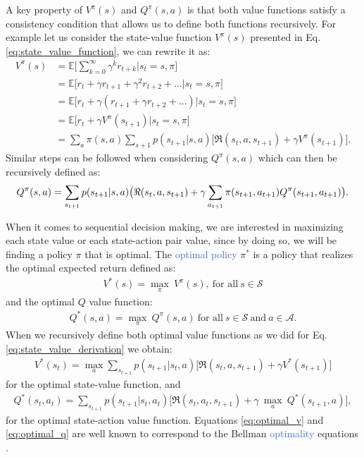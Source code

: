A key property of $V^{\pi}(s)$ and $Q^{\pi}(s,a)$ is that both value functions satisfy a consistency condition that allows us to define both functions recursively. For example let us consider the state-value function $V^{\pi}(s)$ presented in Eq. \ref{eq:state_value_function}, we can rewrite it as:
\begin{equation}
\begin{split}
 V^{\pi}(s) & =\mathds{E}\big[\sum_{k=0}^{\infty}\gamma^{k}r_{t+k}\big| s_t = s, \pi \big] \\ 
 & =\mathds{E}\big[r_{t}+\gamma r_{t+1}+\gamma^{2}r_{t+2}+\ldots \big| s_t =s , \pi \big] \\ 
 & =\mathds{E}\big[r_{t}+\gamma(r_{t+1}+\gamma r_{t+2}+\ldots)\big| s_t =s , \pi \big] \\
 & =\mathds{E}\big[r_{t}+\gamma V^{\pi}(s_{t+1}) \big| s_t =s , \pi \big] \\
 & =\sum_a \pi(s,a) \sum_{s+1} p(s_{t+1}|s,a)\big[\Re(s_t, a, s_{t+1}) + \gamma V^{\pi}(s_{t+1}) \big].
\end{split}
\label{eq:state_value_derivation}
\end{equation}
Similar steps can be followed when considering $Q^{\pi}(s,a)$ which can then be recursively defined as:
\begin{equation}
	Q^{\pi}(s,a) = \sum_{s_{t+1}} p(s_{t+1}|s,a)\big(\Re(s_t, a, s_{t+1}) + \\ \gamma \sum_{a_{t+1}} \pi(s_{t+1},a_{t+1}) Q^{\pi}(s_{t+1}, a_{t+1}) \big).
\end{equation}

When it comes to sequential decision making, we are interested in maximizing each state value or each state-action pair value, since by doing so, we will be finding a policy $\pi$ that is optimal. The \textcolor{RoyalBlue}{optimal policy} $\pi^{*}$ is a policy that realizes the optimal expected return defined as:
\begin{align}
 V^{*}(s)=\underset{\pi}{\max}\:V^{\pi}(s), \ \text{for all} \ s\in\mathcal{S}
\end{align}
and the optimal $Q$ value function:
\begin{align}
Q^{*}(s,a)= \underset{\pi}{\max}\:Q^{\pi}(s,a) \ \text{for all} \ s\in\mathcal{S} \ \text{and} \ a \in\mathcal{    A}.
\end{align}
When we recursively define both optimal value functions as we did for Eq. \ref{eq:state_value_derivation} we obtain:
\begin{align}
    V^{*}(s_t) = \underset{a}{\max}\sum_{s_{t+1}}p(s_{t+1} | s_{t}, a) \bigg[\Re (s_{t}, a, s_{t+1}) + \gamma V^{*}(s_{t+1}) \bigg]
    \label{eq:optimal_v}
\end{align}
for the optimal state-value function, and
\begin{multline}
    Q^{*}(s_t,a_t)=\sum_{s_{t+1}}p(s_{t+1} | s_{t}, a_{t})  \bigg[\Re (s_{t}, a_{t}, s_{t+1}) + \gamma \: \underset{a}{\max} \: Q^{*}(s_{t+1}, a) \bigg],
    \label{eq:optimal_q}
\end{multline}
for the optimal state-action value function. Equations \ref{eq:optimal_v} and \ref{eq:optimal_q} are well known to correspond to the Bellman \textcolor{RoyalBlue}{optimality} equations \cite{bellman1966dynamic}. 

